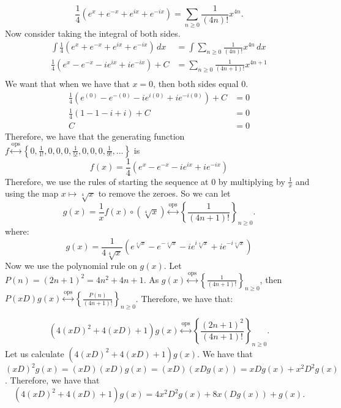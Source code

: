 \documentclass[]{article}
\newcommand{\ops}{\overset{\text{ops}}{\leftrightarrow}}
\begin{document}
\begin{equation}
	\frac{1}{4} \left(e^x + e^{-x} + e^{ix} + e^{-ix} \right) = \sum_{n \geq 0} \frac{1}{(4n)!} x^{4n}.
\end{equation}
Now consider taking the integral of both sides.
\begin{align*}
	\int \frac{1}{4} \left(e^x + e^{-x} + e^{ix} + e^{-ix} \right) \,dx &= \int \sum_{n \geq 0} \frac{1}{(4n)!} x^{4n} \,dx\\
	\frac{1}{4} \left(e^x - e^{-x} -i e^{ix} + i e^{-ix} \right) + C &= \sum_{n \geq 0} \frac{1}{(4n+1)!} x^{4n + 1}\\
\end{align*}
We want that when we have that $x = 0$, then both sides equal 0.
\begin{align*}
	\frac{1}{4} \left(e^{(0)} - e^{-(0)} -i e^{i(0)} + i e^{-i(0)} \right) + C &= 0\\
	\frac{1}{4} \left(1 - 1 - i + i \right) + C &= 0\\
	C &= 0
\end{align*}
Therefore, we have that the generating function $f \ops \left\lbrace 0, \frac{1}{1!}, 0, 0, 0, \frac{1}{5!}, 0, 0, 0, \frac{1}{9!}, ...\right\rbrace$ is
\begin{equation}
	f(x) = \frac{1}{4} \left(e^x - e^{-x} -i e^{ix} + i e^{-ix} \right) 
\end{equation}
Therefore, we use the rules of starting the sequence at 0 by multiplying by $\frac{1}{x}$ and using the map $x \mapsto \sqrt[4]{x}$ to remove the zeroes. So we can let
\begin{equation}
	g(x) = \frac{1}{x} f(x)  \circ (\sqrt[4]{x}) \ops \left\lbrace \frac{1}{(4n + 1)!} \right\rbrace_{n \geq 0}. 
\end{equation}
where:
\begin{equation}
	g(x) = \frac{1}{4\sqrt[4]{x}} \left(e^{\sqrt[4]{x}} - e^{- \sqrt[4]{x}} -i e^{i \sqrt[4]{x}} + i e^{-i \sqrt[4]{x}} \right) 
\end{equation}
Now we use the polynomial rule on $g(x)$. Let $P(n) = (2 n + 1)^2 = 4n^2 + 4n + 1$. As $	g(x) \ops \left\lbrace \frac{1}{(4n + 1)!} \right\rbrace_{n \geq 0}$, then $P(xD) g(x) \ops \left\lbrace \frac{P(n)}{(4n + 1)!} \right\rbrace_{n \geq 0}$. Therefore, we have that:

\begin{equation}
	(4 (xD)^2 + 4(xD) + 1) g(x) \ops \left\lbrace \frac{(2n + 1)^2}{(4n + 1)!} \right\rbrace_{n \geq 0}.
\end{equation}
Let us calculate $(4 (xD)^2 + 4(xD) + 1) g(x)$. We have that $(xD)^2 g(x) = (xD)(xD) g(x) = (xD) (x Dg(x)) = x Dg(x) + x^2 D^2 g(x)$. 
Therefore, we have that
\begin{equation}
	(4 (xD)^2 + 4(xD) + 1) g(x) = 4x^2 D^2 g(x) + 8 x (D g(x)) + g(x).
\end{equation}
\end{document}
